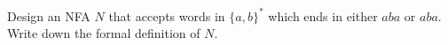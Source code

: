 Design an NFA $N$ that accepts words in $\{a, b\}^*$ which ends in 
either $aba$ or $aba$.
Write down the formal definition of $N$. 
